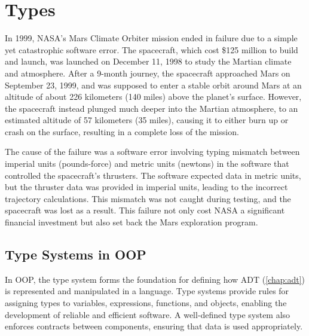 \documentclass[oneside,11pt,dvipsnames]{book}
\newcommand{\code}[1]{\texttt{#1}}
\begin{document}

\chapter{Types}

In 1999, NASA's Mars Climate Orbiter mission ended in failure due to a simple yet catastrophic software error. The spacecraft, which cost \$125 million to build and launch, was launched on December 11, 1998 to study the Martian climate and atmosphere. After a 9-month journey, the spacecraft approached Mars on September 23, 1999, and was supposed to enter a stable orbit around Mars at an altitude of about 226 kilometers (140 miles) above the planet’s surface. However, the spacecraft instead plunged much deeper into the Martian atmosphere, to an estimated altitude of 57 kilometers (35 miles), causing it to either burn up or crash on the surface, resulting in a complete loss of the mission.

The cause of the failure was a software error involving typing mismatch between imperial units (pounds-force) and metric units (newtons) in the software that controlled the spacecraft's thrusters. The software expected data in metric units, but the thruster data was provided in imperial units, leading to the incorrect trajectory calculations. This mismatch was not caught during testing, and the spacecraft was lost as a result. This failure not only cost NASA a significant financial investment but also set back the Mars exploration program. 


\section{Type Systems in OOP}

In OOP, the type system forms the foundation for defining how ADT (\autoref{chap:adt}) is represented and manipulated in a language. Type systems provide rules for assigning types to variables, expressions, functions, and objects, enabling the development of reliable and efficient software. A well-defined type system also enforces contracts between components, ensuring that data is used appropriately.
\end{document}
